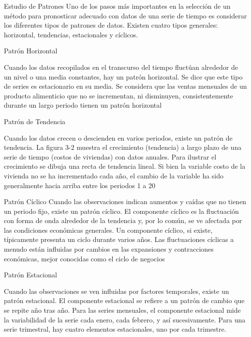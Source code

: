 \begin{frame}{Estudio de Patrones}{}
  Uno de los pasos más importantes en la selección de un método para pronosticar adecuado con datos de una serie de tiempo es considerar los diferentes \alert{tipos de patrones de datos}. Existen cuatro tipos generales: \alert{horizontal, tendencias, estacionales y cíclicos}.
\end{frame}

\begin{frame}{Patrón Horizontal}

  Cuando los datos recopilados en el transcurso del tiempo fluctúan alrededor de un nivel o una media constantes, hay un patrón horizontal. Se dice que este tipo de series es estacionario en su media. Se considera que las ventas mensuales de un producto alimenticio que no se incrementan, ni disminuyen, consistentemente durante un largo periodo tienen un patrón horizontal
\end{frame}

\begin{frame}{Patrón de Tendencia}

Cuando los datos crecen o descienden en varios periodos, existe un patrón de tendencia. La
figura 3-2 muestra el crecimiento (tendencia) a largo plazo de una serie de tiempo (costos de
viviendas) con datos anuales. Para ilustrar el crecimiento se dibuja una recta de tendencia
lineal. Si bien la variable costo de la vivienda no se ha incrementado cada año, el cambio de la
variable ha sido generalmente hacia arriba entre los periodos 1 a 20  
\end{frame}


\begin{frame}{Patrón Cíclico}
  Cuando las observaciones indican aumentos y caídas que no tienen un periodo fijo, existe
un patrón cíclico. El componente cíclico es la fluctuación con forma de onda alrededor de la
tendencia y, por lo común, se ve afectada por las condiciones económicas generales. Un componente cíclico, si existe, típicamente presenta un ciclo durante varios años. Las fluctuaciones
cíclicas a menudo están influidas por cambios en las expansiones y contracciones económicas,
mejor conocidas como el ciclo de negocios
\end{frame}

\begin{frame}{Patrón Estacional}

  Cuando las observaciones se ven influidas por factores temporales, existe un patrón
estacional. El componente estacional se refiere a \alert{un patrón de cambio que se repite año tras
año}. Para las series mensuales, el componente estacional mide la variabilidad de la serie cada
enero, cada febrero, y así sucesivamente. Para una serie trimestral, hay cuatro elementos estacionales, uno por cada trimestre.
  
\end{frame}


